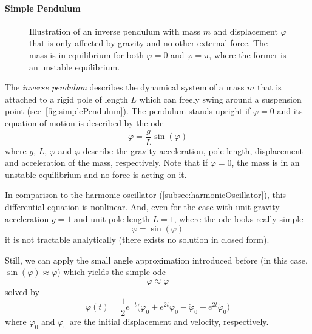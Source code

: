 	\paragraph{Simple Pendulum}
		\label{subsec:simplePendulum}

		\begin{figure}
			\centering
			\tikzSimplePendulum
			\caption{Illustration of an inverse pendulum with mass \(m\) and displacement \(\varphi\) that is only affected by gravity and no other external force. The mass is in equilibrium for both \( \varphi = 0 \) and \( \varphi = \pi \), where the former is an unstable equilibrium.}
			\label{fig:simplePendulum}
		\end{figure}

		The \emph{inverse pendulum} describes the dynamical system of a mass \(m\) that is attached to a rigid pole of length \(L\) which can freely swing around a suspension point (see~\autoref{fig:simplePendulum}). The pendulum stands upright if \( \varphi = 0 \) and its equation of motion is described by the \ac{ode}
		\begin{equation*}
			\ddot{\varphi} = \frac{g}{L} \sin(\varphi)
		\end{equation*}
		where \(g\), \(L\), \(\varphi\) and \(\ddot{\varphi}\) describe the gravity acceleration, pole length, displacement and acceleration of the mass, respectively. Note that if \( \varphi = 0 \), the mass is in an unstable equilibrium and no force is acting on it.

		In comparison to the harmonic oscillator (\autoref{subsec:harmonicOscillator}), this differential equation is nonlinear. And, even for the case with unit gravity acceleration \( g = 1 \) and unit pole length \( L = 1\), where the \ac{ode} looks really simple
		\begin{equation}
			\ddot{\varphi} = \sin(\varphi)  \label{eq:inversePendulum}
		\end{equation}
		it is not tractable analytically (\ie there exists no solution in closed form).

		Still, we can apply the small angle approximation introduced before (in this case, \( \sin(\varphi) \approx \varphi \)) which yields the simple \ac{ode}
		\begin{equation}
			\ddot{\varphi} \approx \varphi  \label{eq:linearizedInversePendulum}
		\end{equation}
		solved by
		\begin{equation*}
			\varphi(t) = \frac{1}{2} e^{-t} \big(\varphi_0 + e^{2t} \varphi_0 - \dot{\varphi}_0 + e^{2t} \dot{\varphi}_0\big)
		\end{equation*}
		where \(\varphi_0\) and \(\dot{\varphi}_0\) are the initial displacement and velocity, respectively.

